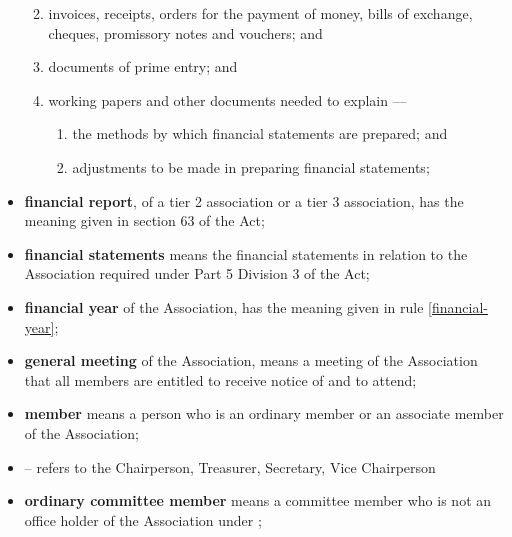 \documentclass[../constitution.tex]{subfiles}
\begin{document}
\begin{itemize}[label={-}]
  \begin{enumerate}
    \def\labelenumi{\alph{enumi})}
    \setcounter{enumi}{0}
  
  \item invoices, receipts, orders for the payment of money, bills of exchange, cheques, promissory notes and vouchers; and
  \item documents of prime entry; and
  \item working papers and other documents needed to explain ---
    \begin{enumerate}
    \def\labelenumi{\roman{enumi})}
    \setcounter{enumi}{0}
    \item the methods by which financial statements are prepared; and
    \item adjustments to be made in preparing financial statements; 
    \end{enumerate}
  \end{enumerate}
\item \textbf{financial report}, of a tier 2 association or a tier 3 association, has the meaning given in section 63 of the Act;
\item \textbf{financial statements} means the financial statements in relation to the Association required under Part 5 Division 3 of the Act;
\item \textbf{financial year}\chadded[id=proofing]{,} of the Association, has the meaning given in rule \ref{financial-year};
\item \textbf{general meeting}\chadded[id=proofing]{,} of the Association, means a meeting of the Association that all members are entitled to receive notice of and to attend;
\item \textbf{member} means a person  who is an ordinary member or an associate member of the Association;
\item \textbf{} -- refers to the Chairperson, Treasurer, Secretary, Vice Chairperson 
\item \textbf{ordinary committee member} means a committee member who is not an office holder of the Association under ;

\end{itemize}
\end{document}

